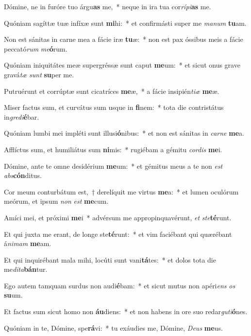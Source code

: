 \item Dómine, ne in furóre tuo árgu\textbf{as} me,~* neque in ira tua cor\textit{rí}\textit{pi}\textbf{as} me.
\item Quóniam sagíttæ tuæ infíxæ sunt \textbf{mi}hi:~* et confirmásti super me \textit{ma}\textit{num} \textbf{tu}am.
\item Non est sánitas in carne mea a fácie iræ \textbf{tu}æ:~* non est pax óssibus meis a fácie peccató\textit{rum} \textit{me}\textbf{ó}rum.
\item Quóniam iniquitátes meæ supergréssæ sunt caput \textbf{me}um:~* et sicut onus grave gravá\textit{tæ} \textit{sunt} \textbf{su}per me.
\item Putruérunt et corrúptæ sunt cicatríces \textbf{me}æ,~* a fácie insipién\textit{ti}\textit{æ} \textbf{me}æ.
\item Miser factus sum, et curvátus sum usque in \textbf{fi}nem:~* tota die contristátus in\textit{gre}\textit{di}\textbf{é}bar.
\item Quóniam lumbi mei impléti sunt illusi\textbf{ó}nibus:~* et non est sánitas in \textit{car}\textit{ne} \textbf{me}a.
\item Afflíctus sum, et humiliátus sum \textbf{ni}mis:~* rugiébam a gémitu \textit{cor}\textit{dis} \textbf{me}i.
\item Dómine, ante te omne desidérium \textbf{me}um:~* et gémitus meus a te non \textit{est} \textit{abs}\textbf{cón}ditus.
\item Cor meum conturbátum est,~† derelíquit me virtus \textbf{me}a:~* et lumen oculórum meórum, et ipsum \textit{non} \textit{est} \textbf{me}cum.
\item Amíci mei, et próximi \textbf{me}i~* advérsum me appropinquavérunt, \textit{et} \textit{ste}\textbf{té}runt.
\item Et qui juxta me erant, de longe ste\textbf{té}runt:~* et vim faciébant qui quærébant á\textit{ni}\textit{mam} \textbf{me}am.
\item Et qui inquirébant mala mihi, locúti sunt vani\textbf{tá}tes:~* et dolos tota die me\textit{di}\textit{ta}\textbf{bán}tur.
\item Ego autem tamquam surdus non audi\textbf{é}bam:~* et sicut mutus non apéri\textit{ens} \textit{os} \textbf{su}um.
\item Et factus sum sicut homo non \textbf{áu}diens:~* et non habens in ore suo redar\textit{gu}\textit{ti}\textbf{ó}nes.
\item Quóniam in te, Dómine, spe\textbf{rá}vi:~* tu exáudies me, Dómine, \textit{De}\textit{us} \textbf{me}us.
